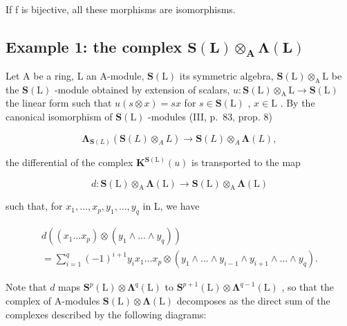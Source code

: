 If f is bijective, all these morphisms are isomorphisms.

\subsection{\texorpdfstring{Example 1: the complex \(\mathbf{S}(\mathbf{L})\otimes_{\mathbf{A}}\boldsymbol{\Lambda}(\mathbf{L})\)}{Example 1: the complex \textbackslash mathbf\{S\}(\textbackslash mathbf\{L\})\textbackslash otimes\_\{\textbackslash mathbf\{A\}\}\textbackslash boldsymbol\{\textbackslash Lambda\}(\textbackslash mathbf\{L\})}}

Let A be a ring, L an A-module, \(\mathbf{S}(\mathrm{L})\) its symmetric algebra, \(\mathbf{S}(\mathrm{L}) \otimes_{\mathrm{A}} \mathrm{L}\) be the \(\mathbf{S}(\mathrm{L})\) -module obtained by extension of scalars, \(u: \mathbf{S}(\mathrm{L}) \otimes_{\mathrm{A}} \mathrm{L} \to \mathbf{S}(\mathrm{L})\) the linear form such that \(u(s \otimes x) = sx\) for \(s \in \mathbf{S}(\mathrm{L})\) , \(x \in \mathrm{L}\) . By the canonical isomorphism of \(\mathbf{S}(\mathrm{L})\) -modules (III, p.~83, prop. 8)

\[
\boldsymbol {\Lambda} _ {\mathbf {S} (L)} (\mathbf {S} (L) \otimes_ {A} L) \rightarrow \mathbf {S} (L) \otimes_ {A} \boldsymbol {\Lambda} (L),
\]

the differential of the complex \(\mathbf{K}^{\mathbf{S}(\mathrm{L})}(u)\) is transported to the map

\[
d: \mathbf {S} (\mathrm{L}) \otimes_ {\mathrm{A}} \boldsymbol {\Lambda} (\mathrm{L}) \rightarrow \mathbf {S} (\mathrm{L}) \otimes_ {\mathrm{A}} \boldsymbol {\Lambda} (\mathrm{L})
\]

such that, for \(x_{1},\ldots,x_{p},y_{1},\ldots,y_{q}\) in L, we have

\[
\begin{array}{l} d \left(\left(x _ {1} \dots x _ {p}\right) \otimes \left(y _ {1} \wedge \dots \wedge y _ {q}\right)\right) \\ = \sum_ {i = 1} ^ {q} (- 1) ^ {i + 1} y _ {i} x _ {1} \dots x _ {p} \otimes \left(y _ {1} \wedge \dots \wedge y _ {i - 1} \wedge y _ {i + 1} \wedge \dots \wedge y _ {q}\right). \end{array}
\]

Note that \(d\) maps \(\mathbf{S}^{p}(\mathrm{L})\otimes\symbf{\Lambda}^{q}(\mathrm{L})\) to \(\mathbf{S}^{p+1}(\mathrm{L})\otimes\symbf{\Lambda}^{q-1}(\mathrm{L})\) , so that the complex of A-modules \(\mathbf{S}(\mathrm{L})\otimes\symbf{\Lambda}(\mathrm{L})\) decomposes as the direct sum of the complexes described by the following diagrams:

